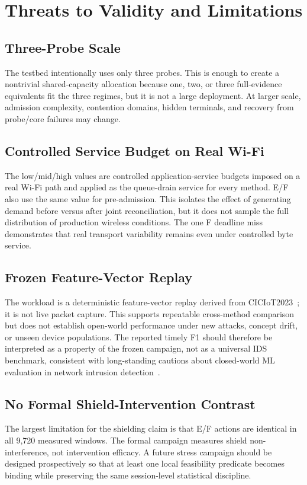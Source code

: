 \documentclass[10pt,journal]{IEEEtran}
\begin{document}
\section{Threats to Validity and Limitations}
\subsection{Three-Probe Scale}
The testbed intentionally uses only three probes. This is enough to create a nontrivial shared-capacity allocation because one, two, or three full-evidence equivalents fit the three regimes, but it is not a large deployment. At larger scale, admission complexity, contention domains, hidden terminals, and recovery from probe/core failures may change.

\subsection{Controlled Service Budget on Real Wi-Fi}
The low/mid/high values are controlled application-service budgets imposed on a real Wi-Fi path and applied as the queue-drain service for every method. E/F also use the same value for pre-admission. This isolates the effect of generating demand before versus after joint reconciliation, but it does not sample the full distribution of production wireless conditions. The one F deadline miss demonstrates that real transport variability remains even under controlled byte service.

\subsection{Frozen Feature-Vector Replay}
The workload is a deterministic feature-vector replay derived from CICIoT2023~\cite{neto2023ciciot}; it is not live packet capture. This supports repeatable cross-method comparison but does not establish open-world performance under new attacks, concept drift, or unseen device populations. The reported timely F1 should therefore be interpreted as a property of the frozen campaign, not as a universal IDS benchmark, consistent with long-standing cautions about closed-world ML evaluation in network intrusion detection~\cite{sommer2010outside}.

\subsection{No Formal Shield-Intervention Contrast}
The largest limitation for the shielding claim is that E/F actions are identical in all 9,720 measured windows. The formal campaign measures shield non-interference, not intervention efficacy. A future stress campaign should be designed prospectively so that at least one local feasibility predicate becomes binding while preserving the same session-level statistical discipline.
\end{document}
